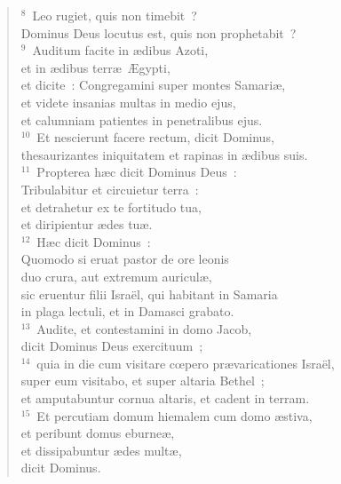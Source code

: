 \begin{verse}
${}^{8}$~Leo rugiet, quis non timebit~?\\ Dominus Deus locutus est, quis non prophetabit~?\\
${}^{9}$~Auditum facite in \ae dibus Azoti,\\ et in \ae dibus terr\ae\ \AE gypti,\\ et dicite~: Congregamini super montes Samari\ae ,\\ et videte insanias multas in medio ejus,\\ et calumniam patientes in penetralibus ejus.\\
${}^{10}$~Et nescierunt facere rectum, dicit Dominus,\\ thesaurizantes iniquitatem et rapinas in \ae dibus suis.\\
${}^{11}$~Propterea h\ae c dicit Dominus Deus~:\\ Tribulabitur et circuietur terra~:\\ et detrahetur ex te fortitudo tua,\\ et diripientur \ae des tu\ae .\\
${}^{12}$~H\ae c dicit Dominus~:\\ Quomodo si eruat pastor de ore leonis\\ duo crura, aut extremum auricul\ae ,\\ sic eruentur filii Isra\"el, qui habitant in Samaria\\ in plaga lectuli, et in Damasci grabato.\\
${}^{13}$~Audite, et contestamini in domo Jacob,\\ dicit Dominus Deus exercituum~;\\
${}^{14}$~quia in die cum visitare cœpero pr\ae varicationes Isra\"el,\\ super eum visitabo, et super altaria Bethel~;\\ et amputabuntur cornua altaris, et cadent in terram.\\
${}^{15}$~Et percutiam domum hiemalem cum domo \ae stiva,\\ et peribunt domus eburne\ae ,\\ et dissipabuntur \ae des mult\ae ,\\ dicit Dominus.\end{verse}


